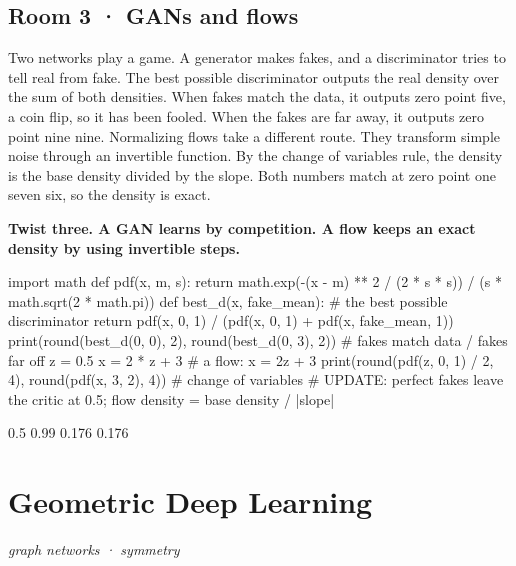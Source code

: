 \documentclass[11pt,a4paper]{report}
\begin{document}
\section*{Room 3 · GANs and flows}
Two networks play a game. A generator makes fakes, and a discriminator tries to tell real from fake. The best possible discriminator outputs the real density over the sum of both densities. When fakes match the data, it outputs zero point five, a coin flip, so it has been fooled. When the fakes are far away, it outputs zero point nine nine. Normalizing flows take a different route. They transform simple noise through an invertible function. By the change of variables rule, the density is the base density divided by the slope. Both numbers match at zero point one seven six, so the density is exact.
\begin{tcolorbox}[colback=yellow!12,colframe=orange!70!black,boxrule=0.4pt,left=4pt,right=4pt,top=2pt,bottom=2pt]\textbf{Twist three. A GAN learns by competition. A flow keeps an exact density by using invertible steps.}\end{tcolorbox}
\begin{Code}
import math
def pdf(x, m, s): return math.exp(-(x - m) ** 2 / (2 * s * s)) / (s * math.sqrt(2 * math.pi))
def best_d(x, fake_mean):                   # the best possible discriminator
    return pdf(x, 0, 1) / (pdf(x, 0, 1) + pdf(x, fake_mean, 1))
print(round(best_d(0, 0), 2), round(best_d(0, 3), 2))    # fakes match data / fakes far off
z = 0.5
x = 2 * z + 3                               # a flow: x = 2z + 3
print(round(pdf(z, 0, 1) / 2, 4), round(pdf(x, 3, 2), 4))    # change of variables
# UPDATE: perfect fakes leave the critic at 0.5; flow density = base density / |slope|
\end{Code}
\begin{Out}
0.5 0.99
0.176 0.176
\end{Out}
\chapter{Geometric Deep Learning}
\textit{graph networks · symmetry}
\end{document}

